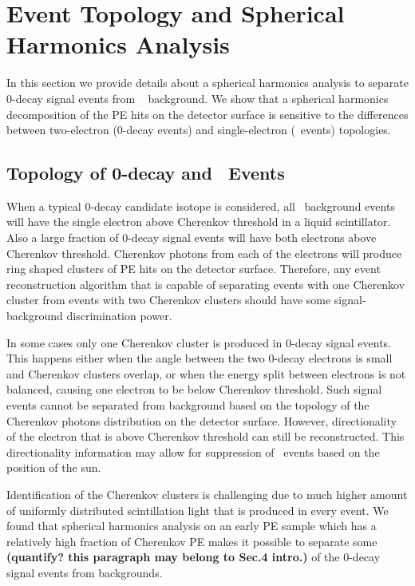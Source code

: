 \section{Event Topology and Spherical Harmonics Analysis}
\label{sec:topology_and_harmonics}

In this section we provide details about a spherical harmonics analysis to separate 0\nbb-decay signal events from \B~ background. 
We show that a spherical harmonics decomposition of the PE hits on the detector surface is sensitive to the differences between 
two-electron (0\nbb-decay events) and single-electron (\B~events) topologies.


\subsection{Topology of 0\nbb-decay and \B~Events}
\label{subsec:topology}

When a typical 0\nbb-decay candidate isotope is considered, all \B~background events will have the single electron above Cherenkov threshold
in a liquid scintillator. Also a large fraction of 0\nbb-decay signal events will have both electrons above Cherenkov threshold. Cherenkov photons
from each of the electrons will produce ring shaped clusters of PE hits on the detector surface. Therefore, any event reconstruction algorithm 
that is capable of separating events with one Cherenkov cluster from events with two Cherenkov clusters should have some signal-background 
discrimination power. 

In some cases only one Cherenkov cluster is produced in 0\nbb-decay signal events. This happens either when the angle between the two 
0\nbb-decay electrons is small and Cherenkov clusters overlap, or when the energy split between electrons is not balanced, causing 
one electron to be below Cherenkov threshold.
Such signal events cannot be separated from background based on the topology of the Cherenkov photons distribution on the detector surface. 
However, directionality of the electron that is above Cherenkov threshold can still be reconstructed. This directionality information 
may allow for suppression of \B~events based on the position of the sun.

Identification of the Cherenkov clusters is challenging due to much higher amount of uniformly distributed scintillation light that is
produced in every event. We found that spherical harmonics analysis on an early PE sample which has a relatively high fraction of 
Cherenkov PE makes it possible to separate some {\bf (quantify? this paragraph may belong to Sec.4 intro.)} of the 0\nbb-decay signal events from backgrounds.

